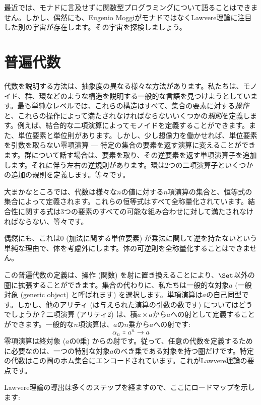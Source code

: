 
\lettrine[lhang=0.17]{最}{近}では、モナドに言及せずに関数型プログラミングについて語ることはできません。しかし、偶然にも、Eugenio MoggiがモナドではなくLawvere理論に注目した別の宇宙が存在します。その宇宙を探検しましょう。

\section{普遍代数}

代数を説明する方法は、抽象度の異なる様々な方法があります。私たちは、モノイド、群、環などのような構造を説明する一般的な言語を見つけようとしています。最も単純なレベルでは、これらの構造はすべて、集合の要素に対する\emph{操作}と、これらの操作によって満たされなければならないいくつかの\emph{規則}を定義します。例えば、結合的な二項演算によってモノイドを定義することができます。また、単位要素と単位則があります。しかし、少し想像力を働かせれば、単位要素を引数を取らない零項演算 --- 特定の集合の要素を返す演算に変えることができます。群について話す場合は、要素を取り、その逆要素を返す単項演算子を追加します。それに伴う左右の逆規則があります。環は2つの二項演算子といくつかの追加の規則を定義します。等々です。

大まかなところでは、代数は様々な$n$の値に対する$n$項演算の集合と、恒等式の集合によって定義されます。これらの恒等式はすべて全称量化されています。結合性に関する式は3つの要素のすべての可能な組み合わせに対して満たされなければならない、等々です。

偶然にも、これは0 (加法に関する単位要素) が乗法に関して逆を持たないという単純な理由で、体を考慮外にします。体の可逆則を全称量化することはできません。

この普遍代数の定義は、操作 (関数) を射に置き換えることにより、$\Set$以外の圏に拡張することができます。集合の代わりに、私たちは一般的な対象$a$ (一般対象 (generic object) と呼ばれます) を選択します。単項演算は$a$の自己同型です。しかし、他のアリティ (は与えられた演算の引数の数です) についてはどうでしょうか？二項演算 (アリティ2) は、積$a\times{}a$から$a$への射として定義することができます。一般的な$n$項演算は、$a$の$n$乗から$a$への射です: 
\[\alpha_n \Colon a^n \to a\]
零項演算は終対象 ($a$の0乗) からの射です。従って、任意の代数を定義するために必要なのは、一つの特別な対象$a$のべき乗である対象を持つ圏だけです。特定の代数はこの圏のホム集合にエンコードされています。これがLawvere理論の要点です。

Lawvere理論の導出は多くのステップを経ますので、ここにロードマップを示します: 

